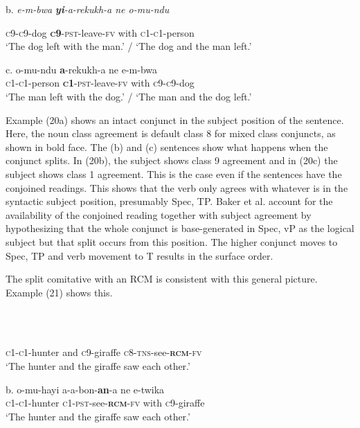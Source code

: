 \glt b.\textit{  e-m-bwa  }\textbf{\textit{yi}}\textit{{}-a-rekukh-a     ne   o-mu-ndu}
\z

       \textsc{c9-c9}{}-dog  \textbf{\textsc{c}}\textbf{9}{}-\textsc{pst}{}-leave-\textsc{fv}   with   \textsc{c1-c1}{}-person\\
\glt   ‘The dog left with the man.’ / ‘The dog and the man left.’
\z

\gll \textup{c.}  o-mu-ndu   \textbf{a}{}-rekukh-a     ne   e-m-bwa\\
       \textsc{c1-c1}{}-person   \textbf{\textsc{c}}\textbf{1}{}-\textsc{pst}{}-leave-\textsc{fv}   with   \textsc{c9-c9}{}-dog\\
\glt   ‘The man left with the dog.’ / ‘The man and the dog left.’
\z

Example (20a) shows an intact conjunct in the subject position of the sentence. Here, the noun class agreement is default class 8 for mixed class conjuncts, as shown in bold face. The (b) and (c) sentences show what happens when the conjunct splits. In (20b), the subject shows class 9 agreement and in (20c) the subject shows class 1 agreement. This is the case even if the sentences have the conjoined readings. This shows that the verb only agrees with whatever is in the syntactic subject position, presumably Spec, TP. Baker et al. account for the availability of the conjoined reading together with subject agreement by hypothesizing that the whole conjunct is base-generated in Spec, vP as the logical subject but that split occurs from this position. The higher conjunct moves to Spec, TP and verb movement to T results in the surface order.  

  The split comitative with an RCM is consistent with this general picture. Example (21) shows this.

\begin{listWWviiiNumxlileveli}
\item \ea\label{ex:}
\\
\ea\label{ex:}
\\
\end{listWWviiiNumxlileveli}
       \textsc{c1-c1}{}-hunter   and   \textsc{c}9-giraffe   \textsc{c8-tns}{}-see-\textbf{\textsc{rcm}}\textsc{{}-fv} \\
\glt   ‘The hunter and the giraffe saw each other.’
\z

\gll \textup{b.}  o-mu-hayi     a-a-bon-\textbf{an}{}-a     ne   e-twika\\
       \textsc{c1-c1}{}-hunter    \textsc{c1-pst}{}-see-\textbf{\textsc{rcm}}\textsc{{}-fv}  with  \textsc{c}9-giraffe   \\
\glt   ‘The hunter and the giraffe saw each other.’
\z


